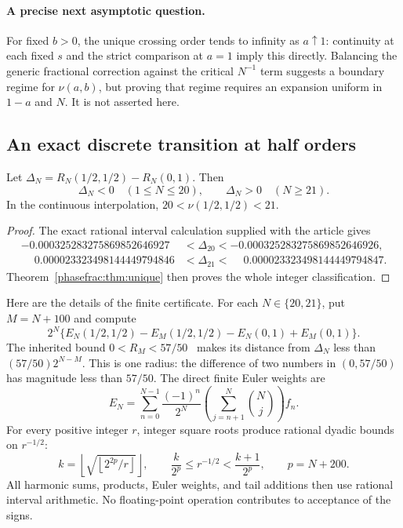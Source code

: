 \paragraph{A precise next asymptotic question.}
For fixed $b>0$, the unique crossing order tends to infinity as
$a\uparrow1$: continuity at each fixed $s$ and the strict comparison
at $a=1$ imply this directly. Balancing the generic fractional
correction against the critical $N^{-1}$ term suggests a boundary
regime for $\nu(a,b)$, but proving that regime requires an expansion
uniform in $1-a$ and $N$. It is not asserted here.

\subsection{An exact discrete transition at half orders}

\begin{corollary}
\label{phasefrac:cor:twentyone}
Let $\Delta_N=R_N(1/2,1/2)-R_N(0,1)$. Then
\[
 \Delta_N<0\quad(1\le N\le20),\qquad
 \Delta_N>0\quad(N\ge21).
\]
In the continuous interpolation,
$20<\nu(1/2,1/2)<21$.
\end{corollary}
\begin{proof}
The exact rational interval calculation supplied with the article gives
\begin{align*}
 -0.000325283275869852646927
 &<\Delta_{20}<-0.000325283275869852646926,\\
  \phantom{-}0.000023323498144449794846
 &<\Delta_{21}<\phantom{-}0.000023323498144449794847.
\end{align*}
Theorem~\ref{phasefrac:thm:unique} then proves the whole integer
classification.
\end{proof}

Here are the details of the finite certificate. For each $N\in\{20,21\}$,
put $M=N+100$ and compute
\[
 2^N\{E_N(1/2,1/2)-E_M(1/2,1/2)
       -E_N(0,1)+E_M(0,1)\}.
\]
The inherited bound $0<R_M<57/50$~\cite{incoming-sharp} makes its
distance from $\Delta_N$ less than $(57/50)2^{N-M}$. This is one
radius: the difference of two numbers in $(0,57/50)$ has magnitude
less than $57/50$. The direct finite Euler weights are
\[
 E_N=\sum_{n=0}^{N-1}
 \frac{(-1)^n}{2^N}\left(\sum_{j=n+1}^{N}\binom Nj\right)f_n.
\]
For every positive integer $r$, integer square roots produce rational
dyadic bounds on $r^{-1/2}$:
\[
 k=\left\lfloor\sqrt{\left\lfloor 2^{2p}/r\right\rfloor}\right\rfloor,
 \qquad
 \frac{k}{2^p}\le r^{-1/2}<\frac{k+1}{2^p},
 \qquad p=N+200.
\]
All harmonic sums, products, Euler weights, and tail additions then
use rational interval arithmetic. No floating-point operation
contributes to acceptance of the signs.

